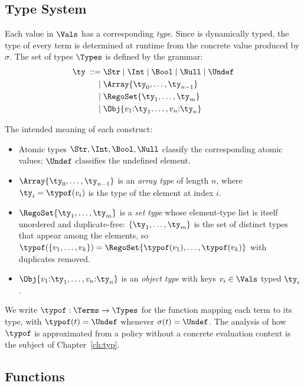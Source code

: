\subsection{Type System}
\label{ss:types}


Each value in $\Vals$ has a corresponding \emph{type}.
Since \rego is dynamically typed, the type of every term is determined at runtime from the concrete value produced by $\sigma$.
The set of \rego types $\Types$ is defined by the grammar:
\begin{align*}
\ty \;::=\; & \Str \mid \Int \mid \Bool \mid \Null \mid \Undef \\
   \mid\;   & \Array{\ty_0,\ldots,\ty_{n-1}} \\
   \mid\;   & \RegoSet{\ty_1,\ldots,\ty_m} \\
   \mid\;   & \Obj{v_1{:}\ty_1,\ldots,v_n{:}\ty_n}
\end{align*}

The intended meaning of each construct:
\begin{itemize}
  \item Atomic types $\Str, \Int, \Bool, \Null$ classify the corresponding atomic values;
        $\Undef$ classifies the undefined element.
  \item $\Array{\ty_0,\ldots,\ty_{n-1}}$ is an \emph{array type} of length $n$,
        where $\ty_i = \typof(v_i)$ is the type of the element at index $i$.
  \item $\RegoSet{\ty_1,\ldots,\ty_m}$ is a \emph{set type} whose element-type list
        is itself unordered and duplicate-free: $\{\ty_1,\ldots,\ty_m\}$ is the set of
        distinct types that appear among the elements, so $\typof(\{v_1,\ldots,v_k\}) =
        \RegoSet{\typof(v_1),\ldots,\typof(v_k)}$ with duplicates removed.
  \item $\Obj{v_1{:}\ty_1,\ldots,v_n{:}\ty_n}$ is an \emph{object type}
        with keys $v_i \in \Vals$ typed $\ty_i$.
\end{itemize}

We write $\typof : \Terms \to \Types$ for the function mapping each term to its type,
with $\typof(t) = \Undef$ whenever $\sigma(t) = \Undef$.
The analysis of how $\typof$ is approximated from a policy without a concrete evaluation
context is the subject of Chapter~\ref{ch:typ}.

\subsection{Functions}
\label{ss:functions}

